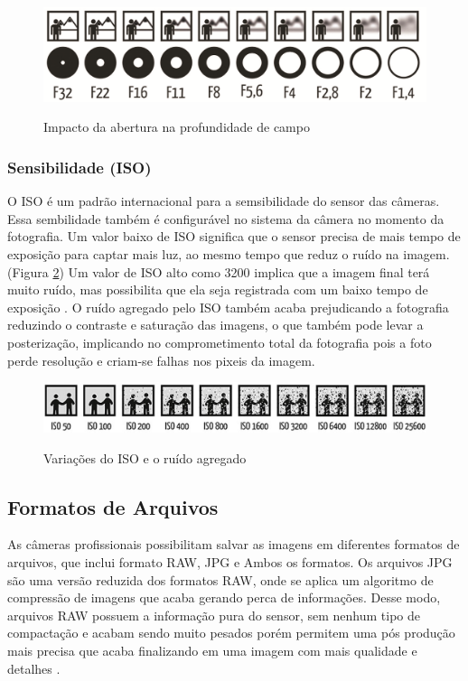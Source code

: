 \begin{figure}[h]
	\centering
	\caption{Impacto da abertura na profundidade de campo}
	\includegraphics[width=0.7\linewidth]{figuras/profundidade}
	\label{fig:profundidade}
\end{figure}

\subsubsection{Sensibilidade (ISO)}

O ISO é um padrão internacional para a semsibilidade do sensor das câmeras. Essa sembilidade também é configurável no sistema da câmera no momento da fotografia. Um valor baixo de ISO significa que o sensor precisa de mais tempo de exposição para captar mais luz, ao mesmo tempo que reduz o ruído na imagem. (Figura \ref{fig:iso})
Um valor de ISO alto como 3200 implica que a imagem final terá muito ruído, mas possibilita que ela seja registrada com um baixo tempo de exposição \cite{book:bbcsky}. O ruído agregado pelo ISO também acaba prejudicando a fotografia reduzindo o contraste e saturação das imagens, o que também pode levar a posterização, implicando no comprometimento total da fotografia pois a foto perde resolução e criam-se falhas nos pixeis da imagem.


\begin{figure}[!htb]
	\centering
	\caption{Variações do ISO e o ruído agregado}
	\includegraphics[width=0.7\linewidth]{figuras/ISO}
	\label{fig:iso}
\end{figure}

\subsection{Formatos de Arquivos}

As câmeras profissionais possibilitam salvar as imagens em diferentes formatos de arquivos, que inclui formato RAW, JPG e Ambos os formatos. Os arquivos JPG são uma versão reduzida dos formatos RAW, onde se aplica um algoritmo de compressão de imagens que acaba gerando perca de informações. Desse modo, arquivos RAW possuem a informação pura do sensor, sem nenhum tipo de compactação e acabam sendo muito pesados porém permitem uma pós produção mais precisa que acaba finalizando em uma imagem com mais qualidade e detalhes \cite{book:bbcsky}.


